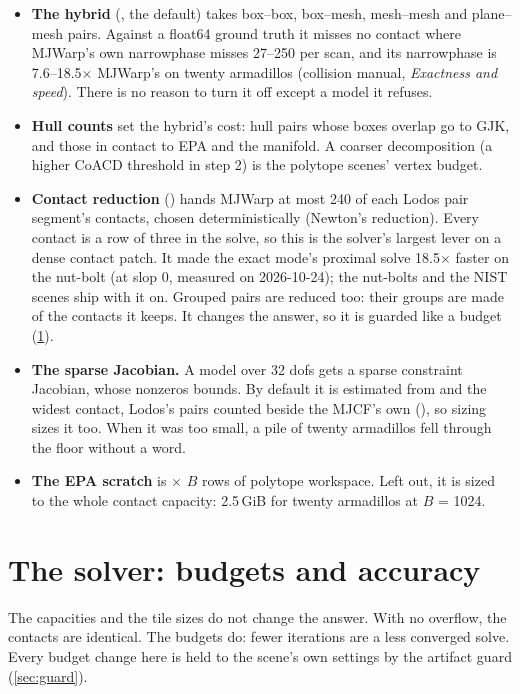 \begin{itemize}
\item \textbf{The hybrid} (, the default) takes box--box, box--mesh, mesh--mesh and plane--mesh pairs. Against a float64 ground truth it misses no contact where MJWarp's own narrowphase misses 27--250 per scan, and its narrowphase is 7.6--18.5$\times$ MJWarp's on twenty armadillos (collision manual, \emph{Exactness and speed}). There is no reason to turn it off except a model it refuses.
\item \textbf{Hull counts} set the hybrid's cost: hull pairs whose boxes overlap go to GJK, and those in contact to EPA and the manifold. A coarser decomposition (a higher CoACD threshold in step 2) is the polytope scenes' vertex budget.
\item \textbf{Contact reduction} () hands MJWarp at most 240 of each Lodos pair segment's contacts, chosen deterministically (Newton's reduction). Every contact is a row of three in the solve, so this is the solver's largest lever on a dense contact patch. It made the exact mode's proximal solve 18.5$\times$ faster on the nut-bolt (at slop 0, measured on 2026-10-24); the nut-bolts and the NIST scenes ship with it on. Grouped pairs are reduced too: their groups are made of the contacts it keeps. It changes the answer, so it is guarded like a budget (\cref{sec:solvers}).
\item \textbf{The sparse Jacobian.} A model over 32 dofs gets a sparse constraint Jacobian, whose nonzeros  bounds. By default it is estimated from  and the widest contact, Lodos's pairs counted beside the MJCF's own (), so sizing  sizes it too. When it was too small, a pile of twenty armadillos fell through the floor without a word.
\item \textbf{The EPA scratch} is  $\times$ $B$ rows of polytope workspace. Left out, it is sized to the whole contact capacity: 2.5\,GiB for twenty armadillos at $B$ = 1024.
\end{itemize}

\section{The solver: budgets and accuracy}\label{sec:solvers}

The capacities and the tile sizes do not change the answer. With no overflow, the contacts are identical. The budgets do: fewer iterations are a less converged solve. Every budget change here is held to the scene's own settings by the artifact guard (\cref{sec:guard}).

